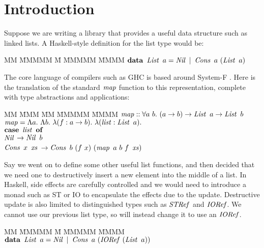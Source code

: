 
\section{Introduction}
\label{Introduction}

Suppose we are writing a library that provides a useful data structure such as linked lists. A Haskell-style definition for the list type would be:
\begin{tabbing}
MM \= MMMMM \= M \= MMMMM \= MMMM \kill
	\> $\textrm{\textbf{data}} \ \operatorname{\mathit{List}} \ a = \operatorname{\mathit{Nil}} \ | \ \operatorname{\mathit{Cons}} \ a \ (\operatorname{\mathit{List}} \ a)$
\end{tabbing}

The core language of compilers such as GHC is based around System-F \cite{sulzmann:system-Fc}. Here is the translation of the standard $\operatorname{\mathit{map}}$ function to this representation, complete with type abstractions and applications:

\begin{tabbing}
MM \= MMM \= MM \= MMMMM \= MMMM \kill
	\> $\imap :: \forall a \ b. \ (a \to b) \to \iList \ a \to \iList \ b$ \\
	\> $\operatorname{\mathit{map}} = \Lambda a. \ \Lambda b. \ \lambda (f : a \to b). \ \lambda (\operatorname{\mathit{list}} : \operatorname{\mathit{List}} \ a).$ \\
	\> \> $\textrm{\textbf{case}} \ \operatorname{\mathit{list}} \ \textrm{\textbf{of}}$ \\
	\> \> \> $\operatorname{\mathit{Nil}}$		\> $\to \operatorname{\mathit{Nil}} \ b$ \\
	\> \> \> $\operatorname{\mathit{Cons}} \ x \ \operatorname{\mathit{xs}}$	\> $\to \iCons \ b \ (f \ x) \ (\imap  \ a \ b \ f \ \ixs)$ 
\end{tabbing}

Say we went on to define some other useful list functions, and then decided that we need one to destructively insert a new element into the middle of a list. In Haskell, side effects are carefully controlled and we would need to introduce a monad such as ST or IO \cite{launchbury:lazy-functional-state-threads} to encapsulate the effects due to the update. Destructive update is also limited to distinguished types such as $\operatorname{\mathit{STRef}}$ and $\operatorname{\mathit{IORef}}$.  We cannot use our previous list type, so will instead change it to use an $\operatorname{\mathit{IORef}}$.

\begin{tabbing}
MM \= MMMMM \= M \= MMMMM \= MMMM \kill
	\> $\textrm{\textbf{data}} \ \operatorname{\mathit{List}} \ a = \operatorname{\mathit{Nil}} \ | \ \operatorname{\mathit{Cons}} \ a \ (\operatorname{\mathit{IORef}} \ (\operatorname{\mathit{List}} \ a))$
\end{tabbing}

